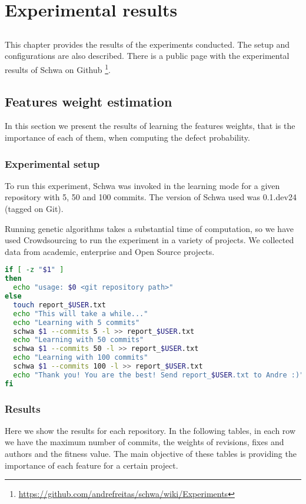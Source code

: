 \chapter{Experimental results} \label{chap:results}

\section*{}
This chapter provides the results of the experiments conducted. The setup and configurations are also described. There is a public page with the experimental results of Schwa on Github \footnote{\url{https://github.com/andrefreitas/schwa/wiki/Experiments}}.

\section{Features weight estimation}
In this section we present the results of learning the features weights, that is the importance of each of them, when computing the defect probability.

\subsection{Experimental setup}
To run this experiment, Schwa was invoked in the learning mode for a given repository with 5, 50 and 100 commits. The version of Schwa used was 0.1.dev24 (tagged on Git).
    
Running genetic algorithms takes a substantial time of computation, so we have used Crowdsourcing to run the experiment in a variety of projects. We collected data from academic, enterprise and Open Source projects.

\begin{lstlisting}[language=bash, caption=Shell script used to learn features weights]
if [ -z "$1" ]
then
  echo "usage: $0 <git repository path>"
else
  touch report_$USER.txt
  echo "This will take a while..."
  echo "Learning with 5 commits"
  schwa $1 --commits 5 -l >> report_$USER.txt
  echo "Learning with 50 commits"
  schwa $1 --commits 50 -l >> report_$USER.txt
  echo "Learning with 100 commits"
  schwa $1 --commits 100 -l >> report_$USER.txt
  echo "Thank you! You are the best! Send report_$USER.txt to Andre :)"
fi
\end{lstlisting}

\subsection{Results}
Here we show the results for each repository. In the following tables, in each row we have the maximum number of commits, the weights of revisions, fixes and authors and the fitness value. The main objective of these tables is providing the importance of each feature for a certain project.

